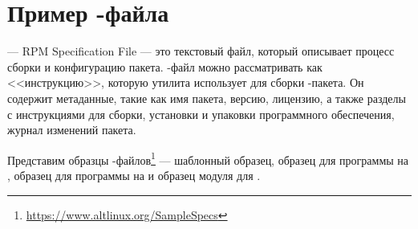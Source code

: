 \section{Пример -файла}
 --- RPM Specification File --- это текстовый файл, который описывает процесс сборки и конфигурацию пакета. -файл можно рассматривать как <<инструкцию>>, которую утилита  использует для сборки -пакета. Он содержит метаданные, такие как имя пакета, версию, лицензию, а также разделы с инструкциями для сборки, установки и упаковки программного обеспечения, журнал изменений пакета.

Представим образцы -файлов\footnote{\href{https://www.altlinux.org/SampleSpecs}{https://www.altlinux.org/SampleSpecs}} --- шаблонный образец, образец для программы на , образец для программы на  и образец модуля для .

